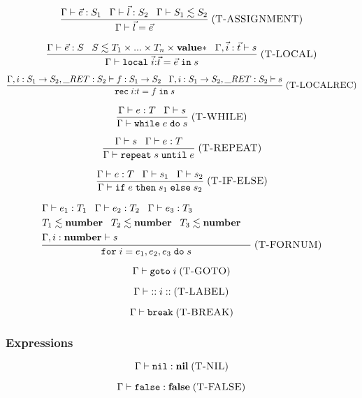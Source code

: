 \documentclass[12pt]{article}
\newcommand{\Top}{\mathbf{value}}
\newcommand{\Nil}{\mathbf{nil}}
\newcommand{\False}{\mathbf{false}}
\newcommand{\Number}{\mathbf{number}}
\newcommand{\kw}[1]{\mathbf{\texttt{#1}}}
\newcommand{\mylabel}[1]{\; (\textsc{#1})}
\newcommand{\env}{\Gamma}
\newcommand{\ret}{\string_RET}
\begin{document}
\[
\frac{\env \vdash \vec{e}:S_{1} \;\;\;
      \env \vdash \vec{l}:S_{2} \;\;\;
      \env \vdash S_{1} \lesssim S_{2}}
     {\env \vdash \vec{l} = \vec{e}}
\mylabel{T-ASSIGNMENT}
\]

\[
\frac{\env \vdash \vec{e}:S \;\;\;
      S \lesssim T_{1} \times {...} \times T_{n} \times \Top{*} \;\;\;
      \env, \vec{i}:\vec{t} \vdash s}
     {\env \vdash \kw{local} \; \vec{i}{:}\vec{t} = \vec{e} \; \kw{in} \; s}
\mylabel{T-LOCAL}
\]

\[
\frac{\env, i:S_{1} \rightarrow S_{2}, \ret:S_{2} \vdash f:S_{1} \rightarrow S_{2} \;\;\;
      \env, i:S_{1} \rightarrow S_{2}, \ret:S_{2} \vdash s}
     {\kw{rec} \; i{:}t = f \; \kw{in} \; s}
\mylabel{T-LOCALREC}
\]

\[
\frac{\env \vdash e:T \;\;\;
      \env \vdash s}
     {\env \vdash \kw{while} \; e \; \kw{do} \; s}
\mylabel{T-WHILE}
\]

\[
\frac{\env \vdash s \;\;\;
      \env \vdash e:T}
     {\env \vdash \kw{repeat} \; s \; \kw{until} \; e}
\mylabel{T-REPEAT}
\]

\[
\frac{\env \vdash e:T \;\;\;
      \env \vdash s_{1} \;\;\;
      \env \vdash s_{2}}
     {\env \vdash \kw{if} \; e \; \kw{then} \; s_{1} \; \kw{else} \; s_{2}}
\mylabel{T-IF-ELSE}
\]

\[
\frac{\begin{aligned}
      & \env \vdash e_{1}:T_{1} \;\;\;
        \env \vdash e_{2}:T_{2} \;\;\;
        \env \vdash e_{3}:T_{3} & \\
      & T_{1} \lesssim \Number \;\;\;
        T_{2} \lesssim \Number \;\;\;
        T_{3} \lesssim \Number & \\
      & \env, i:\Number \vdash s &
      \end{aligned}}
     {\kw{for} \; i = e_{1},e_{2},e_{3} \; \kw{do} \; s}
\mylabel{T-FORNUM}
\]

\[
\env \vdash \kw{goto} \; i
\mylabel{T-GOTO}
\]

\[
\env \vdash {::} \; i \; {::}
\mylabel{T-LABEL}
\]

\[
\env \vdash \kw{break}
\mylabel{T-BREAK}
\]

\subsubsection{Expressions}

\[
\env \vdash \kw{nil} : \Nil
\mylabel{T-NIL}
\]

\[
\env \vdash \kw{false} : \False
\mylabel{T-FALSE}
\]
\end{document}
